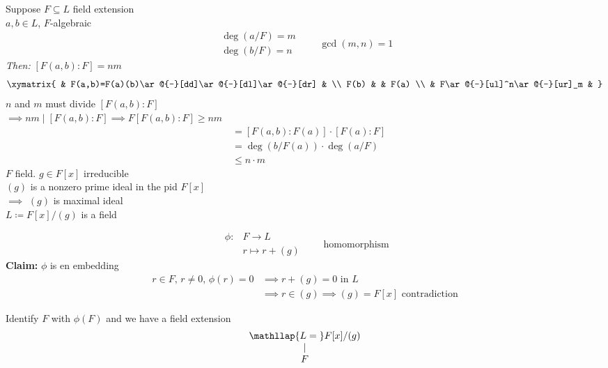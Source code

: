 \ex Suppose $F\subseteq L$ field extension \\
$a,b\in L$, $F$-algebraic
\[ \begin{gathered}
\deg(a/F)=m \\
\deg(b/F)=n
\end{gathered} \qquad \gcd(m,n)=1 \]
\emph{Then:} $[F(a,b):F]=nm$
\[ \xymatrix{
 & F(a,b)=F(a)(b)\ar@{-}[dd]\ar@{-}[dl]\ar@{-}[dr] & \\
F(b) & & F(a) \\
 & F\ar@{-}[ul]^n\ar@{-}[ur]_m &
} \]
$n$ and $m$ must divide $[F(a,b):F]$ \\
$\implies nm\mid [F(a,b):F]\implies F[F(a,b):F]\geq nm$
\begin{align*}
[F(a,b):F] &= [F(a,b):F(a)]\cdot[F(a):F] \\
&= \deg(b/F(a))\cdot\deg(a/F) \\
&\leq n \cdot m
\end{align*}
$F$ field.  $g\in F[x]$ irreducible \\
$(g)$ is a nonzero prime ideal in the pid $F[x]$ \\
$\implies$ $(g)$ is maximal ideal \\
$L\coloneqq F[x]/(g)$ is a field

\[\begin{aligned}
\phi\colon & F \to L \\
& r \mapsto r + (g)
\end{aligned} \qquad \text{homomorphism} \]
\textbf{Claim:} $\phi$ is en embedding \\
\pf\vspace{-\baselineskip}
\begin{align*}
\text{$r\in F$, $r\neq0$, $\phi(r)=0$} &\implies \text{$r+(g)=0$ in $L$} \\
&\implies r\in(g)\implies(g)=F[x] \text{ contradiction}
\end{align*}

Identify $F$ with $\phi(F)$ and we have a field extension
\[ \begin{matrix}
\mathllap{L ={}} F[x]/(g) \\
| \\
F
\end{matrix} \]

